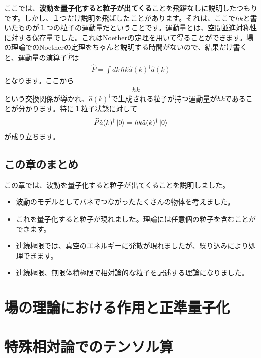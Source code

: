 \documentclass[report,paper=a4, fontsize=12pt, line_length=16cm, number_of_lines=33,dvipdfmx]{jlreq}
\numberwithin{equation}{chapter}
\newcommand{\strong}[1]{{\sffamily \bfseries #1}}
\newcommand{\ah}{\hat{a}}
\newcommand{\Ph}{\widehat{P}}
\begin{document}
ここでは、\strong{波動を量子化すると粒子が出てくる}ことを飛躍なしに説明したつもりです。しかし、１つだけ説明を飛ばしたことがあります。それは、ここで$\hbar k$と書いたものが１つの粒子の運動量だということです。運動量とは、空間並進対称性に対する保存量でした。これはNoetherの定理を用いて得ることができます。場の理論でのNoetherの定理をちゃんと説明する時間がないので、結果だけ書くと、運動量の演算子$\Ph$は
\begin{align}
  \Ph=\int dk \,\hbar k \ah(k)^{\dag}\ah(k)
\end{align}
となります。ここから
\begin{align}
  [\Ph,\ah(k)^{\dag}]=\hbar k
\end{align}
という交換関係が導かれ、$\ah(k)^{\dag}$で生成される粒子が持つ運動量が$\hbar k$であることが分かります。特に１粒子状態に対して
\begin{align}
  \Ph \ah(k)^{\dag}\ket{0}=\hbar k\ah(k)^{\dag}\ket{0}
\end{align}
が成り立ちます。

\section{この章のまとめ}
この章では、波動を量子化すると粒子が出てくることを説明しました。
\begin{itemize}
  \item 波動のモデルとしてバネでつながったたくさんの物体を考えました。
  \item これを量子化すると粒子が現れました。理論には任意個の粒子を含むことができます。
  \item 連続極限では、真空のエネルギーに発散が現れましたが、繰り込みにより処理できます。
  \item 連続極限、無限体積極限で相対論的な粒子を記述する理論になりました。
\end{itemize}

\chapter{場の理論における作用と正準量子化}


\appendix
\chapter{特殊相対論でのテンソル算}
\label{app:tensor}
\end{document}
